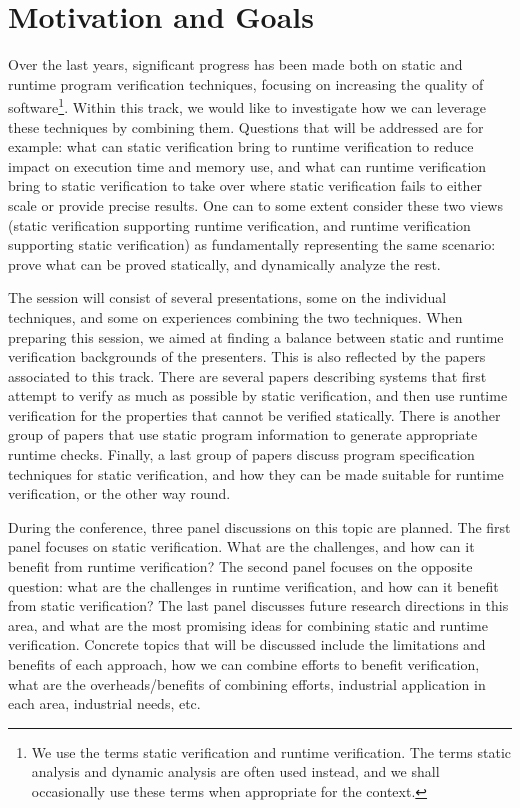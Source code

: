 
\section{Motivation and Goals}

Over the last years, significant progress has been made both on static and runtime program verification techniques, focusing on increasing the quality of software\footnote{We use the terms static verification and runtime verification. The terms static analysis
and dynamic analysis are often used instead, and we shall occasionally use these terms
when appropriate for the context.}. Within this track, we would like to investigate how we can leverage these techniques by combining them. Questions that will be addressed are for example: what can static verification  bring to runtime verification 
to reduce impact on execution time and memory use, and what can runtime verification bring to static verification to take over where static verification fails to either scale or provide precise results. One can to some extent consider these two views (static verification supporting runtime verification, and runtime verification supporting static verification) as fundamentally representing the same scenario: prove what can be proved statically, and dynamically analyze the rest. 

The session will consist of several presentations, some on the individual techniques, and some on experiences combining the two techniques. When preparing this session, we aimed at finding a balance between static and runtime verification backgrounds of the presenters. This is also reflected by the papers associated to this track. There are several papers describing systems that first attempt to verify as much as possible by static verification, and then use runtime verification for the properties that cannot be verified statically. There is another group of papers that use static program information to generate appropriate runtime checks. Finally, a last group of papers discuss program specification techniques for static verification, and how they can be made suitable for runtime verification, or the other way round.

During the conference, three panel discussions on this topic are planned. The first panel focuses on static verification. What are the challenges, and how can it benefit from runtime verification? The second panel focuses on the opposite question: what are the challenges in runtime verification, and how can it benefit from static verification? The last panel  discusses future research directions in this area, and what are the most promising ideas for combining static and runtime verification. Concrete topics that will be discussed include the limitations and benefits of each approach, how we can combine efforts to benefit verification, what are the overheads/benefits of combining efforts, industrial application in each area, industrial needs, etc.



